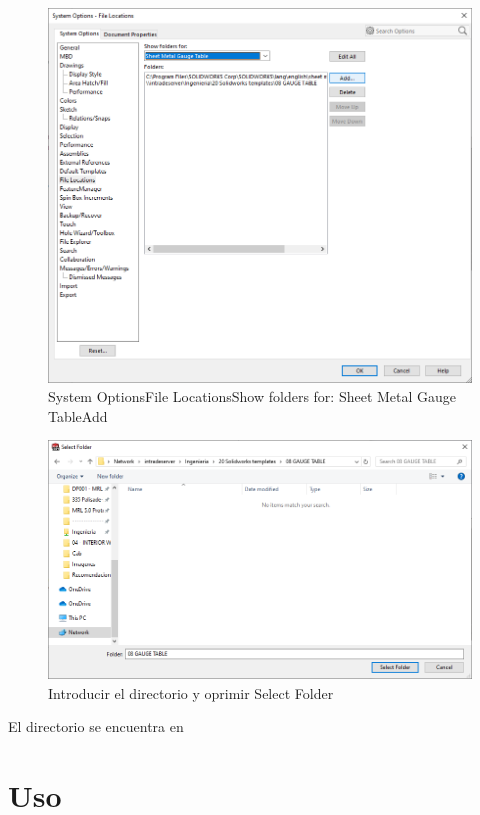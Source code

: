 \documentclass[12pt,letterpaper,final]{report}
\begin{document}
\begin{figure}[H]
	\centering
	\includegraphics[width=0.85\linewidth, height=0.5\textheight,keepaspectratio]{Imagenes/solidworks_sheetmetalgauge_02}
	\caption{System Options\textrightarrow File Locations\textrightarrow Show folders for: Sheet Metal Gauge Table\textrightarrow Add}
	\label{fig:solidworkssheetmetalgauge02}
\end{figure}

\begin{figure}[H]
	\centering
	\includegraphics[width=0.85\linewidth, height=0.5\textheight,keepaspectratio]{Imagenes/solidworks_sheetmetalgauge_03}
	\caption{Introducir el directorio y oprimir Select Folder}
	\label{fig:solidworkssheetmetalgauge03}
\end{figure}

El directorio se encuentra en 

\section{Uso}
\end{document}
